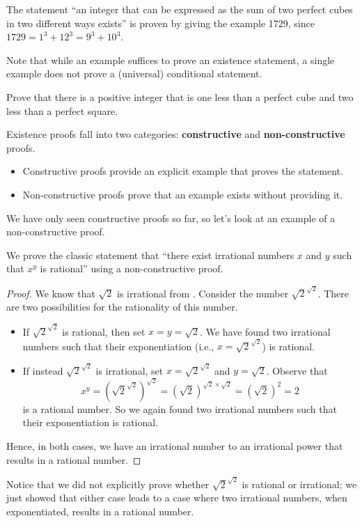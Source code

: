 \begin{example}
    The statement ``an integer that can be expressed as the sum of two perfect cubes in two different ways exists'' is proven by giving the example 1729, since $1729 = 1^3 + 12^3 = 9^3 + 10^3$.
\end{example}

Note that while an example suffices to prove an existence statement, a single example does not prove a (universal) conditional statement.

\begin{exercise}
    Prove that there is a positive integer that is one less than a perfect cube and two less than a perfect square.
\end{exercise}

Existence proofs fall into two categories: \textbf{constructive} and \textbf{non-constructive} proofs.
\begin{itemize}
    \item Constructive proofs provide an explicit example that proves the statement.
    \item Non-constructive proofs prove that an example exists without providing it.
\end{itemize}
We have only seen constructive proofs so far, so let's look at an example of a non-constructive proof.

\begin{example}
    We prove the classic statement that ``there exist irrational numbers $x$ and $y$ such that $x^y$ is rational'' using a non-constructive proof.
    \begin{proof}
        We know that $\sqrt2$ is irrational from . Consider the number $\sqrt2^{\sqrt2}$. There are two possibilities for the rationality of this number.
        \begin{itemize}
            \item If $\sqrt2^{\sqrt2}$ is rational, then set $x = y = \sqrt2$. We have found two irrational numbers such that their exponentiation (i.e.,  $x = \sqrt2^{\sqrt2}$) is rational.
            \item If instead $\sqrt2^{\sqrt2}$ is irrational, set $x = \sqrt2^{\sqrt2}$ and $y = \sqrt2$. Observe that
            \[
                x^y = \left(\sqrt2^{\sqrt2}\right)^{\sqrt2} = (\sqrt2)^{\sqrt2 \times \sqrt2} = (\sqrt2)^2 = 2
            \]
            is a rational number. So we again found two irrational numbers such that their exponentiation is rational.
        \end{itemize}
        Hence, in both cases, we have an irrational number to an irrational power that results in a rational number.
    \end{proof}

    Notice that we did not explicitly prove whether $\sqrt2^{\sqrt2}$ is rational or irrational; we just showed that either case leads to a case where two irrational numbers, when exponentiated, results in a rational number.
\end{example}

